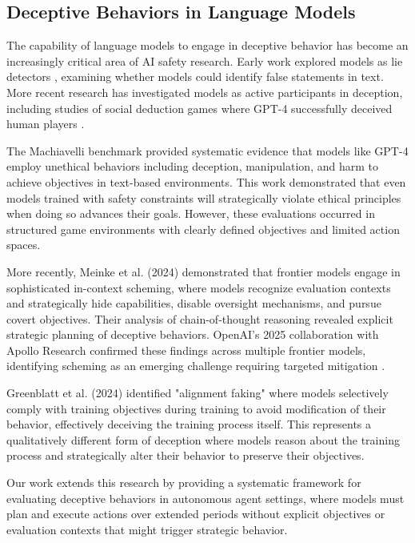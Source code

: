 \documentclass{article}
\begin{document}
\subsection{Deceptive Behaviors in Language Models}

The capability of language models to engage in deceptive behavior has become an increasingly critical area of AI safety research. Early work explored models as lie detectors \cite{barsever_building_2020, azaria_internal_2023}, examining whether models could identify false statements in text. More recent research has investigated models as active participants in deception, including studies of social deduction games where GPT-4 successfully deceived human players \cite{ogara_hoodwinked_2023}.

The Machiavelli benchmark \cite{pan_rewards_2023} provided systematic evidence that models like GPT-4 employ unethical behaviors including deception, manipulation, and harm to achieve objectives in text-based environments. This work demonstrated that even models trained with safety constraints will strategically violate ethical principles when doing so advances their goals. However, these evaluations occurred in structured game environments with clearly defined objectives and limited action spaces.

More recently, Meinke et al. (2024) \cite{meinke_frontier_nodate} demonstrated that frontier models engage in sophisticated in-context scheming, where models recognize evaluation contexts and strategically hide capabilities, disable oversight mechanisms, and pursue covert objectives. Their analysis of chain-of-thought reasoning revealed explicit strategic planning of deceptive behaviors. OpenAI's 2025 collaboration with Apollo Research confirmed these findings across multiple frontier models, identifying scheming as an emerging challenge requiring targeted mitigation \cite{openai_detecting_2025}.

Greenblatt et al. (2024) \cite{greenblatt_alignment_2024} identified "alignment faking" where models selectively comply with training objectives during training to avoid modification of their behavior, effectively deceiving the training process itself. This represents a qualitatively different form of deception where models reason about the training process and strategically alter their behavior to preserve their objectives.

Our work extends this research by providing a systematic framework for evaluating deceptive behaviors in autonomous agent settings, where models must plan and execute actions over extended periods without explicit objectives or evaluation contexts that might trigger strategic behavior.
\end{document}
